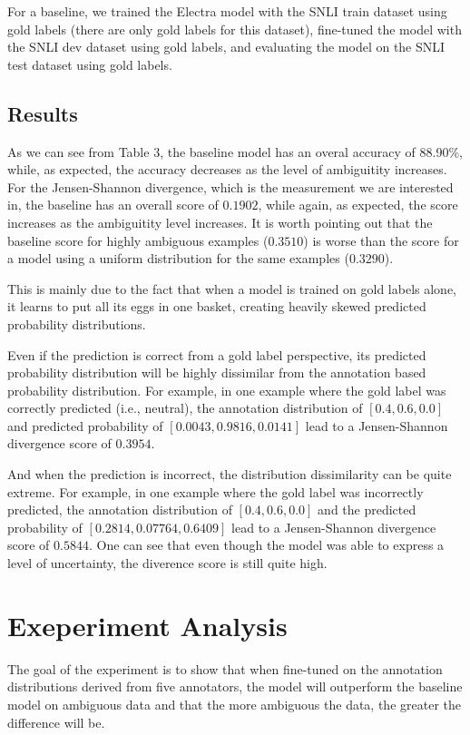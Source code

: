 \documentclass[11pt]{article}
\begin{document}
For a baseline, we trained the Electra model with the SNLI train dataset using gold labels (there are only gold labels
for this dataset), fine-tuned the model with the SNLI dev dataset using gold labels, and evaluating the model on
the SNLI test dataset using gold labels.

\subsection{Results}

As we can see from Table 3, the baseline model has an overal accuracy of 88.90\%, while, as expected, the accuracy
decreases as the level of ambiguitity increases. For the Jensen-Shannon divergence, which is the measurement we
are interested in, the baseline has an overall score of $0.1902$, while again, as expected, the score increases
as the ambiguitity level increases. It is worth pointing out that the baseline score for highly ambiguous examples
($0.3510$) is worse than the score for a model using a uniform distribution for the same examples ($0.3290$).

This is mainly due to the fact that when a model is trained on gold labels alone, it learns to put all its
eggs in one basket, creating heavily skewed predicted probability distributions.

Even if the prediction is correct from a gold label perspective, its predicted probability distribution will be
highly dissimilar from the annotation based probability distribution. For example, in one example where the gold
label was correctly predicted (i.e., neutral), the annotation distribution of $[0.4, 0.6, 0.0]$ and predicted
probability of $[0.0043, 0.9816, 0.0141]$ lead to a Jensen-Shannon divergence score of $0.3954$.

And when the prediction is incorrect, the distribution dissimilarity can be quite extreme. For example, in one
example where the gold label was incorrectly predicted, the annotation distribution of $[0.4, 0.6, 0.0]$ and
the predicted probability of $[0.2814, 0.07764, 0.6409]$ lead to a Jensen-Shannon divergence score of $0.5844$.
One can see that even though the model was able to express a level of uncertainty, the diverence score is still
quite high.

\section{Exeperiment Analysis}

The goal of the experiment is to show that when fine-tuned on the annotation distributions derived from five
annotators, the model will outperform the baseline model on ambiguous data and that the more ambiguous the
data, the greater the difference will be.
\end{document}
